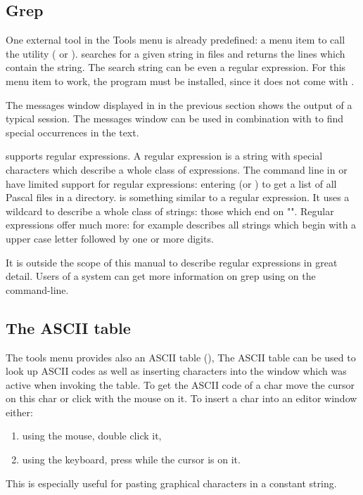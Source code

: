 \subsection{Grep}
\label{se:grep}
One external tool in the Tools menu is already predefined: a
menu item to call the  utility ( or
).  searches for a given string in files and
returns the lines which contain the string. The search string can
be even a regular expression. For this menu item to work, the
 program must be installed, since it does not come with \fpc.

The messages window displayed in  in the previous
section shows the output of a typical  session. The messages
window can be used in combination with  to find special
occurrences in the text.

 supports regular expressions. A regular expression is a
string with special characters which describe a whole class of
expressions. The command line in \dos or \linux have limited
support for regular expressions: entering 
(or ) to get a list of all Pascal files in a
directory.  is something similar to a regular expression.
It uses a wildcard to describe a whole class of strings: those which
end on "".
Regular expressions offer much more: for example \var{[A-Z][0-9]+}
describes all strings which begin with a upper case letter followed by
one or more digits.

It is outside the scope of this manual to describe regular expressions
in great detail. Users of a \linux system can get more information on grep
using  on the command-line.
%
%
\subsection{The ASCII table}
\label{se:asciitable}
The tools menu provides also an ASCII table (),
The ASCII table can be used to look up ASCII codes as well as
inserting characters into the window which was active when invoking the
table. To get the ASCII code of a char move the cursor on this char
or click with the mouse on it. To insert a
char into an editor window either:
\begin{enumerate}
\item using the mouse, double click it,
\item using the keyboard,  press  while the cursor is on it.
\end{enumerate}
This is especially useful for pasting graphical characters in a constant
string.

